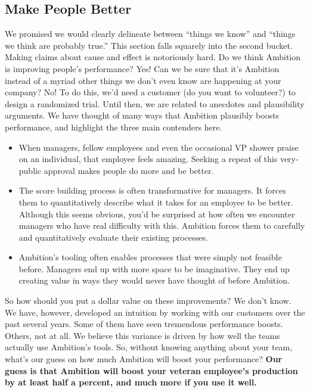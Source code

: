 \documentclass[paper=a4, fontsize=11pt abstract]{scrartcl}
\numberwithin{equation}{section}		%
\numberwithin{figure}{section}			%
\numberwithin{table}{section}				%
\begin{document}
\subsection{Make People Better}
We promised we would clearly delineate between ``things we know'' and ``things we think are probably true.''
This section falls squarely into the second bucket.
Making claims about cause and effect is notoriously hard.
Do we think Ambition is improving people's performance?  Yes!
Can we be sure that it's Ambition instead of a myriad other things we don't even know are happening at your company?  No!
To do this, we'd need  a customer (do you want to volunteer?) to design a randomized trial.
Until then, we are related to anecdotes and plausibility arguments.
We have thought of many ways that Ambition plausibly boosts performance, and highlight the three main contenders here.
\begin{itemize}
    \item When managers, fellow employees and even the occasional VP shower praise on an individual, that employee feels amazing.
    Seeking a repeat of this very-public approval makes people do more and be better.
    
    \item The score building process is often transformative for managers.
    It forces them to quantitatively describe what it takes for an employee to be better.
    Although this seems obvious, you'd be surprised at how often we encounter managers who have real difficulty with this.
    Ambition forces them to carefully and quantitatively evaluate their existing processes.
    
    \item Ambition's tooling often enables processes that were simply not feasible before.
    Managers end up with more space to be imaginative.
    They end up creating value in ways they would never have thought of before Ambition.
\end{itemize}

So how should you put a dollar value on these improvements?
We don't know.
We have, however, developed an intuition by working with our customers over the past several years.
Some of them have seen tremendous performance boosts.
Others, not at all.
We believe this variance is driven by how well the teams actually use Ambition's tools.
So, without knowing anything about your team, what's our guess on how much Ambition will boost your performance?
\textbf{Our guess is that Ambition will boost your veteran employee's production by at least half a percent, and much more if you use it well.}
\end{document}
